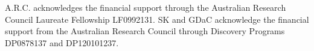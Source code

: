 \documentclass{emulateapj}
\begin{document}
\acknowledgements
A.R.C. acknowledges the financial support through the Australian Research Council Laureate Fellowship LF0992131. SK and GDaC acknowledge the financial support from the Australian Research Council through Discovery Programs DP0878137 and DP120101237.




\end{document}
